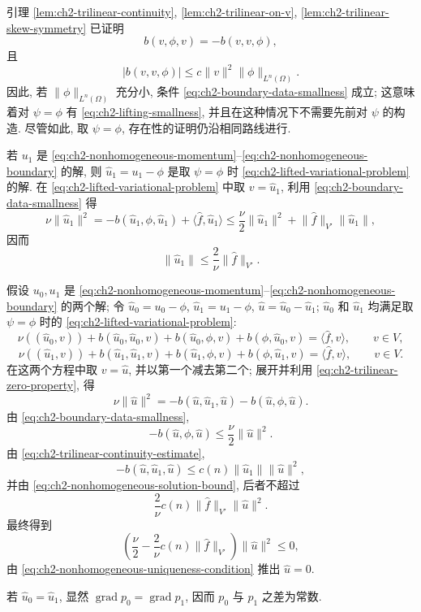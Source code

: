 \begin{Proof}
引理 \ref{lem:ch2-trilinear-continuity}, \ref{lem:ch2-trilinear-on-v}, \ref{lem:ch2-trilinear-skew-symmetry} 已证明
\[
b(v,\phi,v)=-b(v,v,\phi),
\]
且
\[
|b(v,v,\phi)|\leq c\lVert v\rVert^2\lVert\phi\rVert_{L^n(\Omega)}.
\]
因此, 若 $\lVert\phi\rVert_{L^n(\Omega)}$ 充分小, 条件 \eqref{eq:ch2-boundary-data-smallness} 成立; 这意味着对 $\psi=\phi$ 有 \eqref{eq:ch2-lifting-smallness}, 并且在这种情况下不需要先前对 $\psi$ 的构造. 尽管如此, 取 $\psi=\phi$, 存在性的证明仍沿相同路线进行.

若 $u_1$ 是 \eqref{eq:ch2-nonhomogeneous-momentum}--\eqref{eq:ch2-nonhomogeneous-boundary} 的解, 则 $\widehat u_1=u_1-\phi$ 是取 $\psi=\phi$ 时 \eqref{eq:ch2-lifted-variational-problem} 的解. 在 \eqref{eq:ch2-lifted-variational-problem} 中取 $v=\widehat u_1$, 利用 \eqref{eq:ch2-boundary-data-smallness} 得
\[
\nu\lVert\widehat u_1\rVert^2
=-b(\widehat u_1,\phi,\widehat u_1)
+\langle\widehat f,\widehat u_1\rangle
\leq\frac\nu2\lVert\widehat u_1\rVert^2
+\lVert\widehat f\rVert_{V'}\lVert\widehat u_1\rVert,
\]
因而
\begin{equation}
\lVert\widehat u_1\rVert
\leq\frac2\nu\lVert\widehat f\rVert_{V'}.
\label{eq:ch2-nonhomogeneous-solution-bound}
\end{equation}

假设 $u_0,u_1$ 是 \eqref{eq:ch2-nonhomogeneous-momentum}--\eqref{eq:ch2-nonhomogeneous-boundary} 的两个解; 令 $\widehat u_0=u_0-\phi$, $\widehat u_1=u_1-\phi$, $\widehat u=\widehat u_0-\widehat u_1$; $\widehat u_0$ 和 $\widehat u_1$ 均满足取 $\psi=\phi$ 时的 \eqref{eq:ch2-lifted-variational-problem}:
\[
\nu((\widehat u_0,v))+b(\widehat u_0,\widehat u_0,v)
+b(\widehat u_0,\phi,v)+b(\phi,\widehat u_0,v)
=\langle\widehat f,v\rangle,
\qquad v\in V,
\]
\[
\nu((\widehat u_1,v))+b(\widehat u_1,\widehat u_1,v)
+b(\widehat u_1,\phi,v)+b(\phi,\widehat u_1,v)
=\langle\widehat f,v\rangle,
\qquad v\in V.
\]
在这两个方程中取 $v=\widehat u$, 并以第一个减去第二个; 展开并利用 \eqref{eq:ch2-trilinear-zero-property}, 得
\begin{equation}
\nu\lVert\widehat u\rVert^2
=-b(\widehat u,\widehat u_1,\widehat u)
-b(\widehat u,\phi,\widehat u).
\label{eq:ch2-nonhomogeneous-difference-energy}
\end{equation}
由 \eqref{eq:ch2-boundary-data-smallness},
\[
-b(\widehat u,\phi,\widehat u)
\leq\frac\nu2\lVert\widehat u\rVert^2.
\]
由 \eqref{eq:ch2-trilinear-continuity-estimate},
\[
-b(\widehat u,\widehat u_1,\widehat u)
\leq c(n)\lVert\widehat u_1\rVert\lVert\widehat u\rVert^2,
\]
并由 \eqref{eq:ch2-nonhomogeneous-solution-bound}, 后者不超过
\[
\frac2\nu c(n)\lVert\widehat f\rVert_{V'}\lVert\widehat u\rVert^2.
\]
最终得到
\[
\left(\frac\nu2-\frac2\nu c(n)\lVert\widehat f\rVert_{V'}\right)
\lVert\widehat u\rVert^2\leq0,
\]
由 \eqref{eq:ch2-nonhomogeneous-uniqueness-condition} 推出 $\widehat u=0$.

若 $\widehat u_0=\widehat u_1$, 显然 $\operatorname{grad}p_0=\operatorname{grad}p_1$, 因而 $p_0$ 与 $p_1$ 之差为常数.
\end{Proof}

